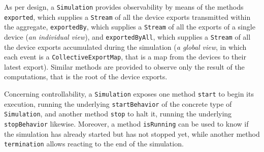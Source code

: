 As per design, a \texttt{Simulation} provides observability by means of the
methods \texttt{exported}, which supplies a \texttt{Stream} of all the device
exports transmitted within the aggregate, \texttt{exportedBy}, which supplies a
\texttt{Stream} of all the exports of a single device (\textit{an individual
view}), and \texttt{exportedByAll}, which supplies a \texttt{Stream} of all the
device exports accumulated during the simulation (\textit{a global view}, in
which each event is a \texttt{CollectiveExportMap}, that is a map from the
devices to their latest export). Similar methods are provided to observe only
the result of the computations, that is the root of the device exports.

Concerning controllability, a \texttt{Simulation} exposes one method
\texttt{start} to begin its execution, running the underlying
\texttt{startBehavior} of the concrete type of \texttt{Simulation}, and another
method \texttt{stop} to halt it, running the underlying \texttt{stopBehavior}
likewise. Moreover, a method \texttt{isRunning} can be used to know if the
simulation has already started but has not stopped yet, while another method
\texttt{termination} allows reacting to the end of the simulation.
